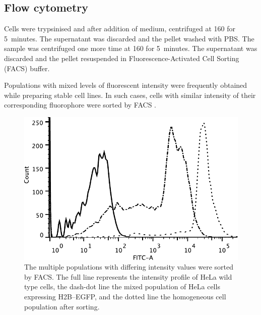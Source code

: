     \subsection{Flow cytometry}

      Cells were trypsinised and after addition of medium, centrifuged
      at \SI{160}{\gn} for 5~minutes. The supernatant was discarded and the
      pellet washed with PBS. The sample was centrifuged one more time at
      \SI{160}{\gn} for 5~minutes. The supernatant was discarded and the
      pellet resuspended in Fluorescence-Activated Cell Sorting (FACS) buffer.

      Populations with mixed levels of fluorescent intensity were
      frequently obtained while preparing stable cell lines. In such
      cases, cells with similar intensity of their corresponding
      fluorophore were sorted by FACS .

      \begin{figure}
        \centering
        \includegraphics[width=\textwidth]{figs/facs-stable-cell-lines.pdf}
                     { The multiple populations with differing
                       intensity values were sorted by FACS. The full
                       line represents the intensity profile of HeLa
                       wild type cells, the dash-dot line the mixed
                       population of HeLa cells expressing H2B--EGFP,
                       and the dotted line the homogeneous cell
                       population after sorting.  }
        \label{fig:methods:facs}
      \end{figure}

